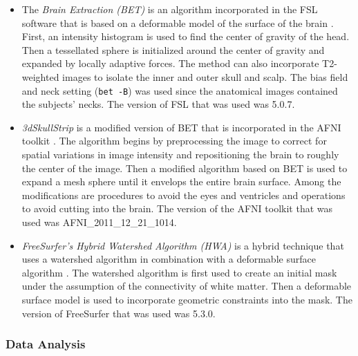\begin{itemize}
    \item The \emph{Brain Extraction \DIFdelbegin {}\DIFdelend \DIFaddbegin {}\DIFaddend (BET)} is an algorithm incorporated in the FSL software that is based on a deformable model of the surface of the brain \cite{Smith2002}. First, an intensity histogram is used to find the center of gravity of the head. Then a tessellated sphere is initialized around the center of gravity and expanded by locally adaptive forces. The method can also incorporate T2-weighted images to isolate the inner and outer skull and scalp. The bias field and neck setting ({\tt bet -B}) was used since the anatomical images contained the subjects' necks. The version of FSL that was used was 5.0.7.

    \item \emph{3dSkullStrip} is a modified version of BET that is incorporated in the AFNI toolkit \cite{afni}. The algorithm begins by preprocessing the image to correct for spatial variations in image intensity and repositioning the brain to roughly the center of the image. Then a modified algorithm based on BET is used to expand a mesh sphere until it envelops the entire brain surface. Among the modifications are procedures to avoid the eyes and ventricles and operations to avoid cutting into the brain. The version of the AFNI toolkit that was used was AFNI\_2011\_12\_21\_1014.

    \item \emph{FreeSurfer's Hybrid Watershed Algorithm (HWA)} is a hybrid technique that uses a watershed algorithm in combination with a deformable surface algorithm \cite{Segonne2004}. The watershed algorithm is first used to create an initial mask under the assumption of the connectivity of white matter. Then a deformable surface model is used to incorporate geometric constraints into the mask. The version of FreeSurfer that was used was 5.3.0.
\end{itemize}



\subsubsection*{Data Analysis}

